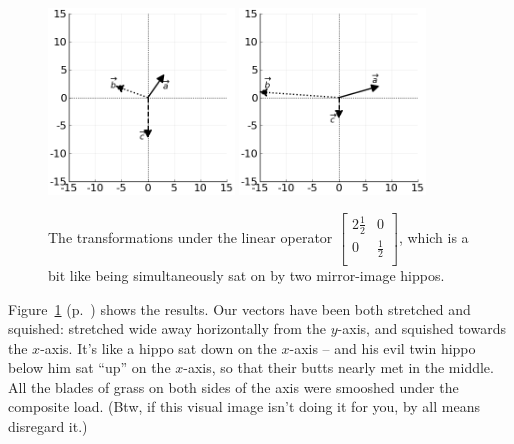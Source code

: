 \begin{figure}[ht]
\centering
\includegraphics[width=0.44\textwidth]{preoperators.png}
\includegraphics[width=0.44\textwidth]{stretchSquishOp.png}
\caption[.]{The transformations under the linear operator 
{\scriptsize $\begin{bmatrix} 2\frac{1}{2} & 0 \\ 0 & \frac{1}{2} \\
\end{bmatrix}$,} which is a bit like being simultaneously sat on by two
mirror-image hippos.}
\label{fig:stretchSquishOp}
\end{figure}


Figure~\ref{fig:stretchSquishOp} (p.~\pageref{fig:stretchSquishOp}) shows the
results. Our vectors have been both stretched and squished: stretched wide away
horizontally from the $y$-axis, and squished towards the $x$-axis. It's like a
hippo sat down on the $x$-axis -- and his evil twin hippo below him sat ``up''
on the $x$-axis, so that their butts nearly met in the middle. All the blades
of grass on both sides of the axis were smooshed under the composite load.
(Btw, if this visual image isn't doing it for you, by all means disregard it.)

\bigskip

\label{flipOperator}

